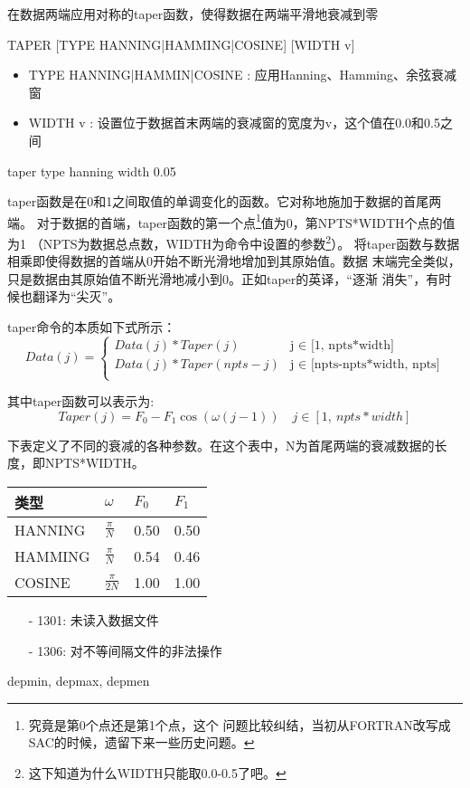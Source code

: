 \label{cmd:taper}

在数据两端应用对称的taper函数，使得数据在两端平滑地衰减到零

\begin{SACSTX}
TAPER [TYPE HANNING|HAMMING|COSINE] [WIDTH v]
\end{SACSTX}

\begin{itemize}
\item TYPE HANNING|HAMMIN|COSINE : 应用Hanning、Hamming、余弦衰减窗
\item WIDTH v : 设置位于数据首末两端的衰减窗的宽度为v，这个值在0.0和0.5之间
\end{itemize}

\begin{SACDFT}
taper type hanning width 0.05
\end{SACDFT}

taper函数是在0和1之间取值的单调变化的函数。它对称地施加于数据的首尾两端。
对于数据的首端，taper函数的第一个点\footnote{究竟是第0个点还是第1个点，这个
问题比较纠结，当初从FORTRAN改写成SAC的时候，遗留下来一些历史问题。}值为0，第NPTS*WIDTH个点的值为1
（NPTS为数据总点数，WIDTH为命令中设置的参数\footnote{这下知道为什么WIDTH只能取0.0-0.5了吧。}）。
将taper函数与数据相乘即使得数据的首端从0开始不断光滑地增加到其原始值。数据
末端完全类似，只是数据由其原始值不断光滑地减小到0。正如taper的英译，``逐渐
消失''，有时候也翻译为``尖灭''。

taper命令的本质如下式所示：
\begin{displaymath}
Data(j) = \left\{
		  \begin{array}{ll}
		  Data(j)*Taper(j) & \textrm{j $\in$ [1,\ npts*width]} \\
		  Data(j)*Taper(npts-j) & \textrm{j $\in$ [npts-npts*width,\ npts]} \\
		  \end{array}
\right.
\end{displaymath}

其中taper函数可以表示为:
\[ Taper(j)=F_0 - F_1\cos(\omega(j-1))	\quad j \in [1,\ npts*width] \]

下表定义了不同的衰减的各种参数。在这个表中，N为首尾两端的衰减数据的长度，即NPTS*WIDTH。

\begin{center}
\begin{tabular}{llll}
\toprule
类型 & $\omega$ & $F_0$	& $F_1$	\\
\midrule
HANNING	&	$\frac{\pi}{N}$	&	0.50	&	0.50	\\
HAMMING	&	$\frac{\pi}{N}$	&	0.54	&	0.46	\\
COSINE	&	$\frac{\pi}{2N}$	&	1.00	&	1.00	\\
\bottomrule
\end{tabular}
\end{center}

\begin{itemize}
\item[-]1301: 未读入数据文件
\item[-]1306: 对不等间隔文件的非法操作
\end{itemize}

depmin, depmax, depmen
